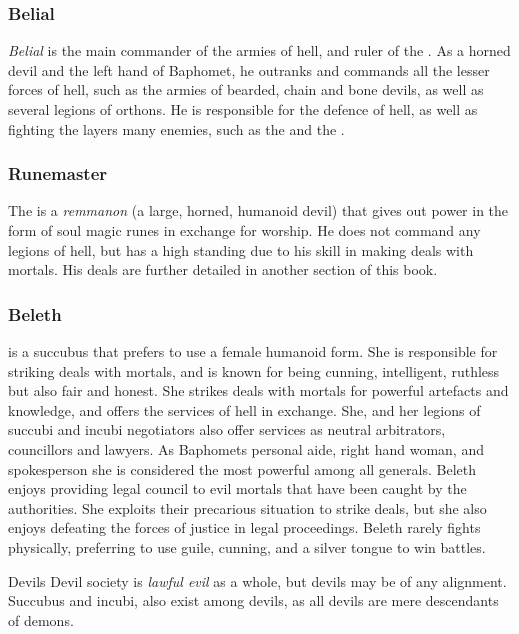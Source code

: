 \subsubsection{Belial}
\label{sec:Belial}

\emph{Belial} is the main commander of the armies of hell, and ruler of the
. As a horned devil and the left hand of Baphomet, he
outranks and commands all the lesser forces of hell, such as the armies of
bearded, chain and bone devils, as well as several legions of orthons. He is
responsible for the defence of hell, as well as fighting the layers many
enemies, such as the  and the .

\subsubsection{Runemaster}

The  is a \emph{remmanon} (a large, horned, humanoid
devil) that gives out power in the form of soul magic runes in exchange for
worship. He does not command any legions of hell, but has a high standing due
to his skill in making deals with mortals. His deals are further detailed in
another section of this book.

\subsubsection{Beleth}
\label{sec:Beleth}

 is a succubus that prefers to use a female
humanoid form. She is responsible for striking deals with mortals, and is
known for being cunning, intelligent, ruthless but also fair and honest. She
strikes deals with mortals for powerful artefacts and knowledge, and offers
the services of hell in exchange. She, and her legions of succubi and incubi
negotiators also offer services as neutral arbitrators, councillors and
lawyers. As Baphomets personal aide, right hand woman, and spokesperson she is
considered the most powerful among all generals. Beleth enjoys providing legal
council to evil mortals that have been caught by the authorities. She exploits
their precarious situation to strike deals, but she also enjoys defeating the
forces of justice in legal proceedings. Beleth rarely fights physically,
preferring to use guile, cunning, and a silver tongue to win battles.

\begin{35e}{Devils}
  Devil society is \emph{lawful evil} as a whole, but devils may be of any
  alignment. Succubus and incubi, also exist among devils, as all devils are
  mere descendants of demons.
\end{35e}

